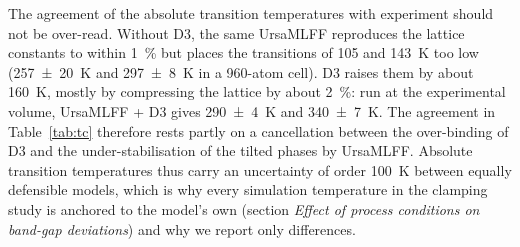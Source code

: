 The agreement of the absolute transition temperatures with experiment should not be
over-read. Without D3, the same UrsaMLFF reproduces the lattice constants to within
\SI{1}{\percent} but places the transitions of \CsSnI{} 105 and \SI{143}{K} too low
(\SI{257 \pm 20}{K} and \SI{297 \pm 8}{K} in a 960-atom cell). D3 raises them by about
\SI{160}{K}, mostly by compressing the lattice by about \SI{2}{\percent}: run at the
experimental volume, UrsaMLFF + D3 gives \SI{290 \pm 4}{K} and \SI{340 \pm 7}{K}. The agreement in
Table~\ref{tab:tc} therefore rests partly on a cancellation between the over-binding of D3
and the under-stabilisation of the tilted phases by UrsaMLFF.  Absolute transition temperatures thus carry an
uncertainty of order \SI{100}{K} between equally defensible models, which is why every
simulation temperature in the clamping study is anchored to the model's own \Tc{}
(section \emph{Effect of process conditions on band-gap deviations}) and why we report only differences.

